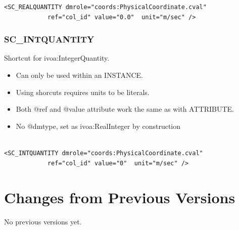 \documentclass[11pt,a4paper]{ivoa}
\begin{document}
\begin{lstlisting}[caption={ivoa:RealQuantity example},style=XML]
<SC_REALQUANTITY dmrole="coords:PhysicalCoordinate.cval"
            ref="col_id" value="0.0"  unit="m/sec" />
\end{lstlisting}

\subsubsection{SC\_INTQUANTITY}
Shortcut for ivoa:IntegerQuantity.

\begin{itemize}
    \item Can only be used within an INSTANCE.        
    \item Using shorcuts requires units to be literals.    
    \item Both @ref and @value attribute work the same as with ATTRIBUTE.
    \item No @dmtype,  set as ivoa:RealInteger by construction
 \end{itemize}


\begin{lstlisting}[caption={ivoa:IntegerQuantity example},style=XML,basicstyle=\small]

<SC_INTQUANTITY dmrole="coords:PhysicalCoordinate.cval"
            ref="col_id" value="0"  unit="m/sec" />
\end{lstlisting}

\appendix
\section{Changes from Previous Versions}

No previous versions yet.  



\end{document}
